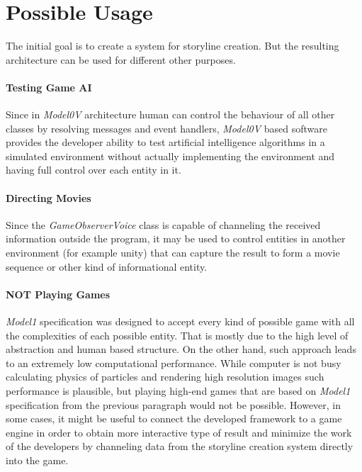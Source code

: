 \section{Possible Usage}
The initial goal is to create a system for storyline creation. But the resulting architecture can be used for different other purposes.
\paragraph{Testing Game AI}
Since in \textit{Model0V} architecture human can control the behaviour of all other classes by resolving messages and event handlers, \textit{Model0V} based software provides the developer ability to test artificial intelligence algorithms in a simulated environment without actually implementing the environment and having full control over each entity in it.
\paragraph{Directing Movies}
Since the \textit{GameObserverVoice} class is capable of channeling the received information outside the program, it may be used to control entities in another environment (for example unity) that can capture the result to form a movie sequence or other kind of informational entity.
\paragraph{NOT Playing Games}
\textit{Model1} specification was designed to accept every kind of possible game with all the complexities of each possible entity. That is mostly due to the high level of abstraction and human based structure. On the other hand, such approach leads to an extremely low computational performance. While computer is not busy calculating physics of particles and rendering high resolution images such performance is plausible, but playing high-end games that are based on \textit{Model1} specification from the previous paragraph would not be possible. However, in some cases, it might be useful to connect the developed framework to a game engine in order to obtain more interactive type of result and minimize the work of the developers by channeling data from the storyline creation system directly into the game.

